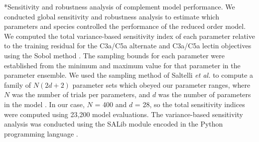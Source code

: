 \documentclass[12pt]{article}
\makeatletter
\renewcommand\subsection{\@startsection
	{subsection}{2}{0mm}
	{-0.05in}
	{-0.5\baselineskip}
	{\normalfont\normalsize\bfseries}}
\makeatother
\begin{document}

\subsection*{Sensitivity and robustness analysis of complement model performance.}
We conducted global sensitivity and robustness analysis to estimate which parameters and species controlled the performance of the reduced order model.
We computed the total variance-based sensitivity index of each parameter relative to the training residual for the C3a/C5a alternate and C3a/C5a lectin objectives
using the Sobol method \cite{SOBOL_METHOD}. The sampling bounds for each parameter were established from the minimum and maximum value for that parameter in the parameter ensemble.
We used the sampling method of Saltelli \textit{et al.} to compute a family of $N\left(2d+2\right)$ parameter sets which obeyed our parameter ranges,
where $N$ was the number of trials per parameters, and $d$ was the number of parameters in the model \cite{saltelli2010variance}.
In our case, $N$ = 400 and $d$ = 28, so the total sensitivity indices were computed using 23,200 model evaluations.
The variance-based sensitivity analysis was conducted using the SALib module encoded in the Python programming language \cite{SALIB}.
\end{document}
